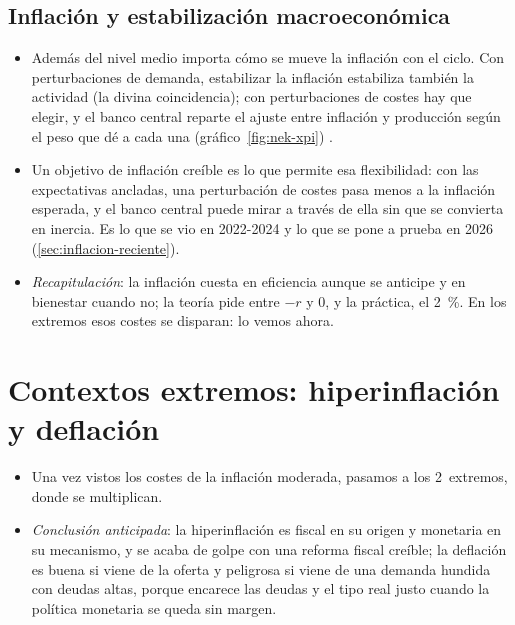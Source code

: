 \documentclass[11pt]{article}
\begin{document}
\subsection{Inflación y estabilización macroeconómica}\label{sec:estabilizacion}

\begin{itemize}
\item Además del nivel medio importa cómo se mueve la inflación con el ciclo. Con perturbaciones de demanda, estabilizar la inflación estabiliza también la actividad (la divina coincidencia); con perturbaciones de costes hay que elegir, y el banco central reparte el ajuste entre inflación y producción según el peso que dé a cada una (gráfico~\ref{fig:nek-xpi})  .
\item Un objetivo de inflación creíble es lo que permite esa flexibilidad: con las expectativas ancladas, una perturbación de costes pasa menos a la inflación esperada, y el banco central puede mirar a través de ella sin que se convierta en inercia. Es lo que se vio en 2022-2024 y lo que se pone a prueba en 2026 (\ref{sec:inflacion-reciente}).
\item \emph{Recapitulación}: la inflación cuesta en eficiencia aunque se anticipe y en bienestar cuando no; la teoría pide entre $-r$ y 0, y la práctica, el 2~\%. En los extremos esos costes se disparan: lo vemos ahora.
\end{itemize}

\section{Contextos extremos: hiperinflación y deflación}\label{sec:extremos}

\begin{itemize}
\item Una vez vistos los costes de la inflación moderada, pasamos a los 2~extremos, donde se multiplican.
\item \emph{Conclusión anticipada}: la hiperinflación es fiscal en su origen y monetaria en su mecanismo, y se acaba de golpe con una reforma fiscal creíble; la deflación es buena si viene de la oferta y peligrosa si viene de una demanda hundida con deudas altas, porque encarece las deudas y el tipo real justo cuando la política monetaria se queda sin margen.
\end{itemize}
\end{document}
